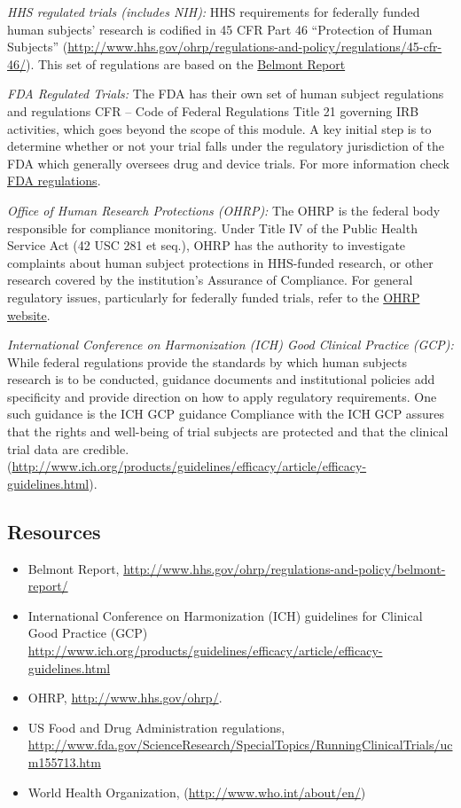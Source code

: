\documentclass[]{book}
\providecommand{\tightlist}{%
  \setlength{\itemsep}{0pt}\setlength{\parskip}{0pt}}
\begin{document}
\emph{HHS regulated trials (includes NIH):} HHS requirements for
federally funded human subjects' research is codified in 45 CFR Part 46
``Protection of Human Subjects''
(\url{http://www.hhs.gov/ohrp/regulations-and-policy/regulations/45-cfr-46/}).
This set of regulations are based on the
\href{http://www.hhs.gov/ohrp/regulations-and-policy/belmont-report/}{Belmont
Report}

\emph{FDA Regulated Trials:} The FDA has their own set of human subject
regulations and regulations CFR -- Code of Federal Regulations Title 21
governing IRB activities, which goes beyond the scope of this module. A
key initial step is to determine whether or not your trial falls under
the regulatory jurisdiction of the FDA which generally oversees drug and
device trials. For more information check
\href{http://www.fda.gov/ScienceResearch/SpecialTopics/RunningClinicalTrials/ucm155713.htm}{FDA
regulations}.

\emph{Office of Human Research Protections (OHRP):} The OHRP is the
federal body responsible for compliance monitoring. Under Title IV of
the Public Health Service Act (42 USC 281 et seq.), OHRP has the
authority to investigate complaints about human subject protections in
HHS-funded research, or other research covered by the institution's
Assurance of Compliance. For general regulatory issues, particularly for
federally funded trials, refer to the
\href{http://www.hhs.gov/ohrp/}{OHRP website}.

\emph{International Conference on Harmonization (ICH) Good Clinical
Practice (GCP):} While federal regulations provide the standards by
which human subjects research is to be conducted, guidance documents and
institutional policies add specificity and provide direction on how to
apply regulatory requirements. One such guidance is the ICH GCP guidance
Compliance with the ICH GCP assures that the rights and well-being of
trial subjects are protected and that the clinical trial data are
credible.
(\url{http://www.ich.org/products/guidelines/efficacy/article/efficacy-guidelines.html}).

\subsection{Resources}\label{resources-3}

\begin{itemize}
\tightlist
\item
  Belmont Report,
  \url{http://www.hhs.gov/ohrp/regulations-and-policy/belmont-report/}
\item
  International Conference on Harmonization (ICH) guidelines for
  Clinical Good Practice (GCP)
  \url{http://www.ich.org/products/guidelines/efficacy/article/efficacy-guidelines.html}
\item
  OHRP, \url{http://www.hhs.gov/ohrp/}.
\item
  US Food and Drug Administration regulations,
  \url{http://www.fda.gov/ScienceResearch/SpecialTopics/RunningClinicalTrials/ucm155713.htm}
\item
  World Health Organization, (\url{http://www.who.int/about/en/})
\end{itemize}
\end{document}
